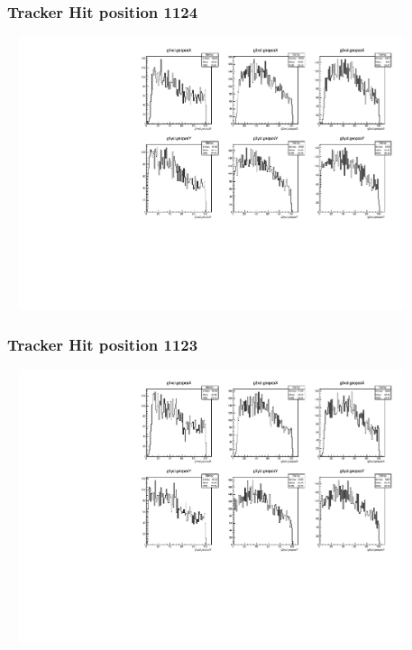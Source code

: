 \documentclass[slidestop,compress,mathserif]{beamer}
\begin{document}
\begin{frame}\frametitle{Tracker Hit position 1124}
	 \includegraphics[width=12cm,height=8cm]{Tracker_Hit_position_1124.pdf}
\end{frame}
\begin{frame}\frametitle{Tracker Hit position 1123}
	 \includegraphics[width=12cm,height=8cm]{Tracker_Hit_position_1123.pdf}
\end{frame}
\end{document}
